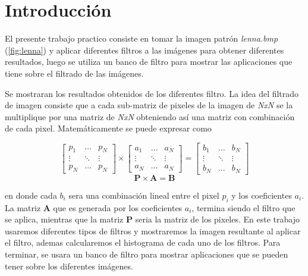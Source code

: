 \section{Introducción}

El presente trabajo practico consiste en tomar la imagen patrón \textit{lenna.bmp} (\ref{fig:lenna}) y aplicar diferentes filtros a las imágenes para  obtener diferentes resultados, luego se utiliza un banco de filtro para mostrar las aplicaciones que tiene sobre el filtrado de las imágenes.

Se mostraran los resultados obtenidos de los diferentes filtro. La idea del filtrado de imagen consiste que a cada sub-matriz de pixeles de la imagen de \textit{NxN} se la multiplique por una matriz de \textit{NxN} obteniendo así una matriz con combinación de cada pixel. Matemáticamente se puede expresar como

\begin{equation}
	\begin{bmatrix}
		p_1 & \ldots & p_N\\
		\vdots & \ddots & \vdots\\
		p_N & \ldots & p_N
	\end{bmatrix} \times 
	\begin{bmatrix}
		a_1 & \ldots & a_N\\
		\vdots & \ddots & \vdots\\
		a_N & \ldots & a_N
	\end{bmatrix}=	\begin{bmatrix}
		b_1 & \ldots & b_N\\
		\vdots & \ddots & \vdots\\
		b_N & \ldots & b_N
	\end{bmatrix}
\end{equation}
\begin{equation}
	\textbf{P}\times \textbf{A} = \textbf{B}
\end{equation}


en donde cada $b_i$ sera una combinación lineal entre el pixel $p_i$ y los coeficientes $a_i$. La matriz \textbf{A} que es generada por los coeficientes $a_i$, termina siendo el filtro que se aplica, mientras que la matriz \textbf{P} seria la matriz de los pixeles. En este trabajo usaremos diferentes tipos de filtros y mostraremos la imagen resultante al aplicar el filtro, ademas calcularemos el histograma de cada uno de los filtros. Para terminar, se usara un banco de filtro para mostrar aplicaciones que se pueden tener sobre los diferentes imágenes.

